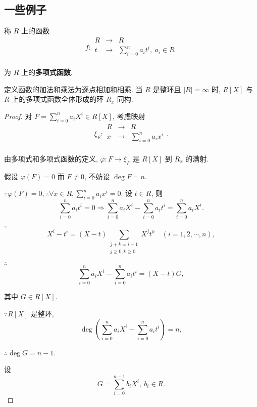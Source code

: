 \documentclass[color=black,device=normal,lang=cn,mode=geye]{elegantnote}
\begin{document}
\subsection{一些例子}
\begin{example}\label{exp2.5}
    称 $R$ 上的函数
    \[f:\begin{array}{rcl}
        R & \to & R \\
        t & \to & \sum\limits_{i=0}^{n}a_it^i,\ a_i\in R \\
    \end{array}\]

    为 $R$ 上的\textbf{多项式函数}.

    定义函数的加法和乘法为逐点相加和相乘. 当 $R$ 是整环且 $|R|=\infty$ 时, $R[X]$ 与 $R$ 上的多项式函数全体形成的环 $R_x$ 同构.
\end{example}
\begin{proof}
    对 $F=\sum\limits_{i=0}^{n}a_iX^i\in R[X]$, 考虑映射
    \[\xi_F:\begin{array}{rcl}
        R & \to & R \\
        x & \to & \sum\limits_{i=0}^{n}a_ix^i \\
    \end{array}.\]

    由多项式和多项式函数的定义, $\varphi:F\to\xi_F$ 是 $R[X]$ 到 $R_x$ 的满射.

    假设 $\varphi(F)=0$ 而 $F\neq0$, 不妨设 $\deg F=n$.

    $\because\varphi(F)=0,\therefore\forall x\in R,\sum\limits_{i=0}^{n}a_ix^i=0$. 设 $t\in R$, 则
    \[\sum\limits_{i=0}^{n}a_it^i=0\Rightarrow\sum\limits_{i=0}^{n}a_iX^i-\sum\limits_{i=0}^{n}a_it^i=\sum\limits_{i=0}^{n}a_iX^i.\]

    $\because$
    \[X^i-t^i=(X-t)\sum\limits_{\substack{j+k=i-1\\j\geq0,k\geq0}}X^jt^k\quad(i=1,2,\cdots,n),\]

    $\therefore$
    \begin{equation}\label{eq2.3}
        \sum\limits_{i=0}^{n}a_iX^i-\sum\limits_{i=0}^{n}a_it^i=(X-t)G,
    \end{equation}

    其中 $G\in R[X]$.

    $\because R[X]$ 是整环,
    \[\deg\left(\sum\limits_{i=0}^{n}a_iX^i-\sum\limits_{i=0}^{n}a_it^i\right)=n,\]

    $\therefore\deg G=n-1$.

    设
    \[G=\sum\limits_{i=0}^{n-1}b_iX^i,\ b_i\in R.\]


\end{proof}
\end{document}
